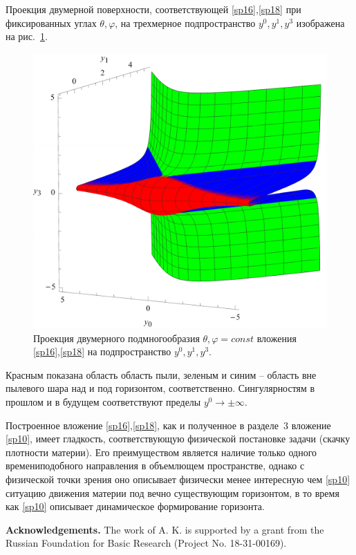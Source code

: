 \documentclass[12pt]{article}
\begin{document}
Проекция двумерной поверхности, соответствующей \eqref{sp16},\eqref{sp18}
при фиксированных углах $\theta,\varphi$, на трехмерное подпространство $y^0,y^1,y^3$ изображена
на рис.~\ref{pic_emb}.
\begin{figure}[h!]
\centering
\includegraphics[width=0.55\linewidth]{col_emb42-c2.pdf}
\caption{\label{pic_emb}
Проекция двумерного подмногообразия $\theta,\varphi=const$ вложения \eqref{sp16},\eqref{sp18} на подпространство $y^0,y^1,y^3$.
}
\end{figure}
Красным показана область область пыли,
зеленым и синим -- область вне пылевого шара над и под горизонтом, соответственно.
Сингулярностям в прошлом и в будущем соответствуют пределы $y^0\to\pm\infty$.

Построенное вложение \eqref{sp16},\eqref{sp18}, как и полученное в разделе~3 вложение \eqref{sp10},
имеет гладкость, соответствующую физической постановке задачи (скачку плотности материи).
Его преимуществом является наличие только одного времениподобного направления в объемлющем пространстве,
однако с физической точки зрения оно описывает физически менее интересную чем \eqref{sp10} ситуацию
движения материи под вечно существующим горизонтом, в то время как \eqref{sp10} описывает динамическое формирование горизонта.


{\bf Acknowledgements.}
The work of A. K. is supported by a grant from the Russian Foundation for Basic Research (Project No. 18-31-00169).



\end{document}

